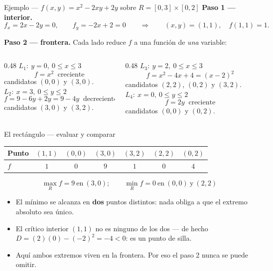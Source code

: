 \documentclass[11pt,aspectratio=169]{beamer}
\begin{document}
\begin{frame}{Ejemplo --- $f(x,y)=x^2-2xy+2y$ sobre $R=[0,3]\times[0,2]$}
  \textbf{Paso 1 --- interior.}
  \[
    f_x=2x-2y=0,\qquad f_y=-2x+2=0
    \qquad\Longrightarrow\qquad (x,y)=(1,1),\quad f(1,1)=1.
  \]
  \par\pause\smallskip
  \textbf{Paso 2 --- frontera.} Cada lado reduce $f$ a una función de \emph{una} variable:
  \vspace{2pt}
  \begin{columns}[t]
    \begin{column}{0.48\textwidth}
      \small
      \pause
      $L_1:\ y=0,\ 0\le x\le 3$
      \[ f=x^2\ \text{ creciente} \]
      candidatos $(0,0)$ y $(3,0)$.
      \pause
      \vspace{4pt}
      $L_2:\ x=3,\ 0\le y\le 2$
      \[ f=9-6y+2y=9-4y\ \text{ decreciente} \]
      candidatos $(3,0)$ y $(3,2)$.
    \end{column}
    \begin{column}{0.48\textwidth}
      \small
      \pause
      $L_3:\ y=2,\ 0\le x\le 3$
      \[ f=x^2-4x+4=(x-2)^2 \]
      candidatos $(2,2)$, $(0,2)$ y $(3,2)$.
      \pause
      \vspace{4pt}
      $L_4:\ x=0,\ 0\le y\le 2$
      \[ f=2y\ \text{ creciente} \]
      candidatos $(0,0)$ y $(0,2)$.
    \end{column}
  \end{columns}
\end{frame}

\begin{frame}{El rectángulo --- evaluar y comparar}
  \begin{center}
  \begin{tabular}{lcccccc}
    \toprule
    \textbf{Punto} & $(1,1)$ & $(0,0)$ & $(3,0)$ & $(3,2)$ & $(2,2)$ & $(0,2)$ \\
    \midrule
    $f$ & $1$ & $0$ & $9$ & $1$ & $0$ & $4$ \\
    \bottomrule
  \end{tabular}
  \end{center}
  \pause
  \vspace{4pt}
  \[
    \boxed{\max_R f=9\ \text{en}\ (3,0);\qquad \min_R f=0\ \text{en}\ (0,0)\ \text{y}\ (2,2)}
  \]
  \pause
  \vspace{2pt}
  \small
  \begin{itemize}
    \item El mínimo se alcanza en \textbf{dos} puntos distintos: nada obliga a que el extremo absoluto sea único.
    \pause
    \item El crítico interior $(1,1)$ no es ninguno de los dos --- de hecho $D=(2)(0)-(-2)^2=-4<0$: es un punto de silla.
    \pause
    \item Aquí ambos extremos viven en la frontera. Por eso el paso 2 nunca se puede omitir.
  \end{itemize}
\end{frame}
\end{document}
